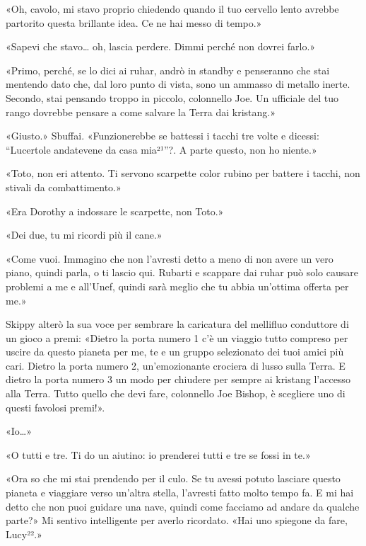 «Oh, cavolo, mi stavo proprio chiedendo quando il tuo cervello lento
avrebbe partorito questa brillante idea. Ce ne hai messo di tempo.»

«Sapevi che stavo\ldots{} oh, lascia perdere. Dimmi perché non dovrei
farlo.»

«Primo, perché, se lo dici ai ruhar, andrò in standby e penseranno che
stai mentendo dato che, dal loro punto di vista, sono un ammasso di
metallo inerte. Secondo, stai pensando troppo in piccolo, colonnello
Joe. Un ufficiale del tuo rango dovrebbe pensare a come salvare la Terra
dai kristang.»

«Giusto.» Sbuffai. «Funzionerebbe se battessi i tacchi tre volte e
dicessi: ``Lucertole andatevene da casa mia²¹''?. A parte questo, non ho
niente.»

«Toto, non eri attento. Ti servono scarpette color rubino per battere i
tacchi, non stivali da combattimento.»

«Era Dorothy a indossare le scarpette, non Toto.»

«Dei due, tu mi ricordi più il cane.»

«Come vuoi. Immagino che non l'avresti detto a meno di non avere un vero
piano, quindi parla, o ti lascio qui. Rubarti e scappare dai ruhar può
solo causare problemi a me e all'Unef, quindi sarà meglio che tu abbia
un'ottima offerta per me.»

Skippy alterò la sua voce per sembrare la caricatura del mellifluo
conduttore di un gioco a premi: «Dietro la porta numero 1 c'è un viaggio
tutto compreso per uscire da questo pianeta per me, te e un gruppo
selezionato dei tuoi amici più cari. Dietro la porta numero 2,
un'emozionante crociera di lusso sulla Terra. E dietro la porta numero 3
un modo per chiudere per sempre ai kristang l'accesso alla Terra. Tutto
quello che devi fare, colonnello Joe Bishop, è scegliere uno di questi
favolosi premi!».

«Io\ldots»

«O tutti e tre. Ti do un aiutino: io prenderei tutti e tre se fossi in
te.»

«Ora so che mi stai prendendo per il culo. Se tu avessi potuto lasciare
questo pianeta e viaggiare verso un'altra stella, l'avresti fatto molto
tempo fa. E mi hai detto che non puoi guidare una nave, quindi come
facciamo ad andare da qualche parte?» Mi sentivo intelligente per averlo
ricordato. «Hai uno spiegone da fare, Lucy²².»

